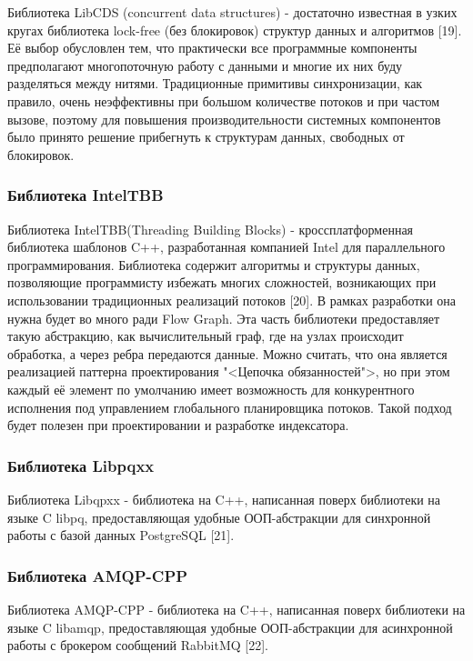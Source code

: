Библиотека LibCDS (concurrent data structures) - достаточно известная в узких кругах библиотека lock-free (без блокировок) структур данных и алгоритмов [19]. Её выбор обусловлен тем, что практически все программные компоненты предполагают многопоточную работу с данными и многие их них буду разделяться между нитями. Традиционные примитивы синхронизации, как правило, очень неэффективны при большом количестве потоков и при частом вызове, поэтому для повышения производительности системных компонентов было принято решение прибегнуть к структурам данных, свободных от блокировок.

\subsubsection{Библиотека IntelTBB}

Библиотека IntelTBB(Threading Building Blocks) - кроссплатформенная библиотека шаблонов C++, разработанная компанией Intel для параллельного программирования. Библиотека содержит алгоритмы и структуры данных, позволяющие программисту избежать многих сложностей, возникающих при использовании традиционных реализаций потоков [20]. В рамках разработки она нужна будет во много ради Flow Graph. Эта часть библиотеки предоставляет такую абстракцию, как вычислительный граф, где на узлах происходит обработка, а через ребра передаются данные. Можно считать, что она является реализацией паттерна проектирования "<Цепочка обязанностей">, но при этом каждый её элемент по умолчанию имеет возможность для конкурентного исполнения под управлением глобального планировщика потоков. Такой подход будет полезен при проектировании и разработке индексатора.

\subsubsection{Библиотека Libpqxx}

Библиотека Libqpxx - библиотека на C++, написанная поверх библиотеки на языке C libpq, предоставляющая удобные ООП-абстракции для синхронной работы с базой данных PostgreSQL [21].

\subsubsection{Библиотека AMQP-CPP}

Библиотека AMQP-CPP - библиотека на C++, написанная поверх библиотеки на языке C libamqp, предоставляющая удобные ООП-абстракции для асинхронной работы с брокером сообщений RabbitMQ [22].


